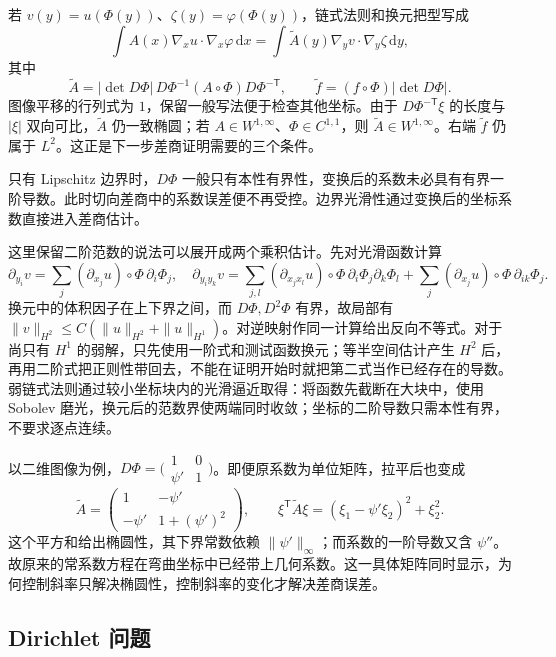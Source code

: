 \ProseParagraphBreak

若 \(v(y)=u(\Phi(y))\)、\(\zeta(y)=\varphi(\Phi(y))\)，链式法则和换元把型写成
\[
 \int A(x)\nabla_xu\cdot\nabla_x\varphi\,\mathrm dx
 =\int\widetilde A(y)\nabla_yv\cdot\nabla_y\zeta\,\mathrm dy,
\]
其中
\[\widetilde A=|\det D\Phi|\,D\Phi^{-1}(A\circ\Phi)D\Phi^{-\mathsf T},
 \qquad\widetilde f=(f\circ\Phi)|\det D\Phi|.\]
图像平移的行列式为 \(1\)，保留一般写法便于检查其他坐标。由于 \(D\Phi^{-\mathsf T}\xi\) 的长度与 \(|\xi|\) 双向可比，\(\widetilde A\) 仍一致椭圆；若 \(A\in W^{1,\infty}\)、\(\Phi\in C^{1,1}\)，则 \(\widetilde A\in W^{1,\infty}\)。右端 \(\widetilde f\) 仍属于 \(L^2\)。这正是下一步差商证明需要的三个条件。

\ProseParagraphBreak

只有 Lipschitz 边界时，\(D\Phi\) 一般只有本性有界性，变换后的系数未必具有有界一阶导数。此时切向差商中的系数误差便不再受控。边界光滑性通过变换后的坐标系数直接进入差商估计。

这里保留二阶范数的说法可以展开成两个乘积估计。先对光滑函数计算
\[
 \partial_{y_i}v=\sum_j(\partial_{x_j}u)\circ\Phi\,\partial_i\Phi_j,
\quad
 \partial_{y_i y_k}v=
 \sum_{j,l}(\partial_{x_jx_l}u)\circ\Phi\,\partial_i\Phi_j\partial_k\Phi_l
 +\sum_j(\partial_{x_j}u)\circ\Phi\,\partial_{ik}\Phi_j.
\]
换元中的体积因子在上下界之间，而 \(D\Phi,D^2\Phi\) 有界，故局部有
\(\|v\|_{H^2}\le C(\|u\|_{H^2}+\|u\|_{H^1})\)。对逆映射作同一计算给出反向不等式。对于尚只有 \(H^1\) 的弱解，只先使用一阶式和测试函数换元；等半空间估计产生 \(H^2\) 后，再用二阶式把正则性带回去，不能在证明开始时就把第二式当作已经存在的导数。弱链式法则通过较小坐标块内的光滑逼近取得：将函数先截断在大块中，使用 Sobolev 磨光，换元后的范数界使两端同时收敛；坐标的二阶导数只需本性有界，不要求逐点连续。

以二维图像为例，\(D\Phi=\bigl(\begin{smallmatrix}1&0\\\psi'&1\end{smallmatrix}\bigr)\)。即便原系数为单位矩阵，拉平后也变成
\[\widetilde A=\begin{pmatrix}1&-\psi'\\-\psi'&1+(\psi')^2\end{pmatrix},\qquad
 \xi^{\mathsf T}\widetilde A\xi=(\xi_1-\psi'\xi_2)^2+\xi_2^2.\]
这个平方和给出椭圆性，其下界常数依赖 \(\|\psi'\|_\infty\)；而系数的一阶导数又含 \(\psi''\)。故原来的常系数方程在弯曲坐标中已经带上几何系数。这一具体矩阵同时显示，为何控制斜率只解决椭圆性，控制斜率的变化才解决差商误差。

\subsection{Dirichlet 问题}
\label{b2:subsec:160302}

